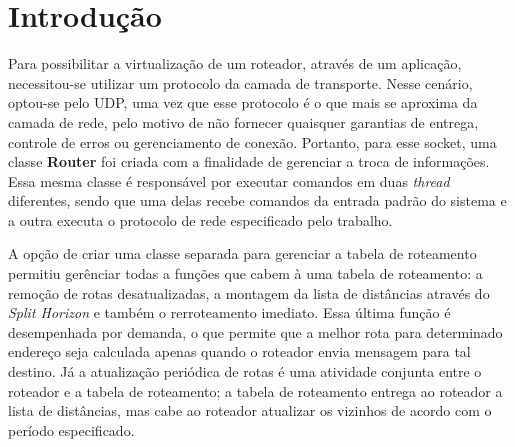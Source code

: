 \section{Introdução}

Para possibilitar a virtualização de um roteador, através de um aplicação,
necessitou-se utilizar um protocolo da camada de transporte.
Nesse cenário, optou-se pelo UDP, uma vez que esse protocolo é o que mais se
aproxima da camada de rede, pelo motivo de não fornecer quaisquer garantias
de entrega, controle de erros ou gerenciamento de conexão.
Portanto, para esse socket, uma classe \textbf{Router} foi criada com a
finalidade de gerenciar a troca de informações.
Essa mesma classe é responsável por executar comandos em duas \textit{thread}
diferentes, sendo que uma delas recebe comandos da entrada padrão do sistema e 
a outra executa o protocolo de rede especificado pelo trabalho.

A opção de criar uma classe separada para gerenciar a tabela de roteamento
permitiu gerênciar todas a funções que cabem à uma tabela de roteamento: a
remoção de rotas desatualizadas, a montagem da lista de distâncias através
do \textit{Split Horizon} e também o rerroteamento imediato. Essa última função
é desempenhada por demanda, o que permite que a melhor rota para determinado
endereço seja calculada apenas quando o roteador envia mensagem para tal
destino. Já a atualização periódica de rotas é uma atividade conjunta entre o
roteador e a tabela de roteamento; a tabela de roteamento entrega ao roteador
a lista de distâncias, mas cabe ao roteador atualizar os vizinhos de acordo com
o período especificado.